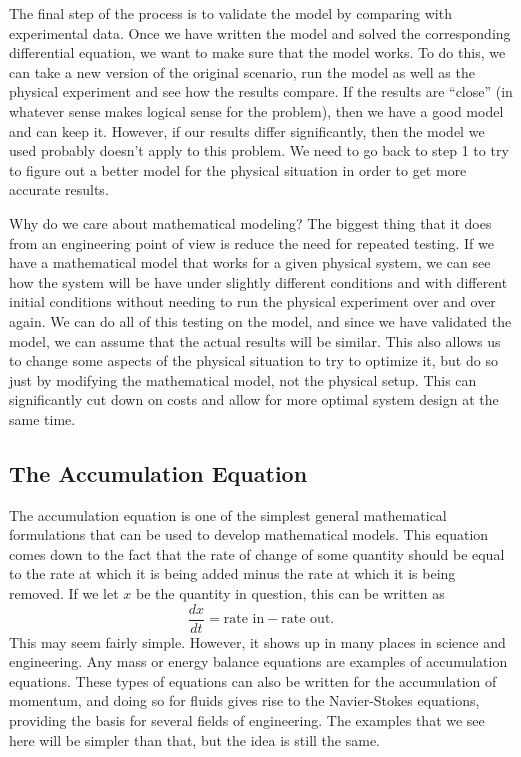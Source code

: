 The final step of the process is to validate the model by comparing with experimental data. Once we have written the model and solved the corresponding differential equation, we want to make sure that the model works. To do this, we can take a new version of the original scenario, run the model as well as the physical experiment and see how the results compare. If the results are ``close'' (in whatever sense makes logical sense for the problem), then we have a good model and can keep it. However, if our results differ significantly, then the model we used probably doesn't apply to this problem. We need to go back to step 1 to try to figure out a better model for the physical situation in order to get more accurate results.

Why do we care about mathematical modeling? The biggest thing that it does from an engineering point of view is reduce the need for repeated testing. If we have a mathematical model that works for a given physical system, we can see how the system will be have under slightly different conditions and with different initial conditions without needing to run the physical experiment over and over again. We can do all of this testing on the model, and since we have validated the model, we can assume that the actual results will be similar. This also allows us to change some aspects of the physical situation to try to optimize it, but do so just by modifying the mathematical model, not the physical setup. This can significantly cut down on costs and allow for more optimal system design at the same time.

\subsection{The Accumulation Equation}

The accumulation equation is one of the simplest general mathematical formulations that can be used to develop mathematical models. This equation comes down to the fact that the rate of change of some quantity should be equal to the rate at which it is being added minus the rate at which it is being removed. If we let $x$ be the quantity in question, this can be written as
\begin{equation}
\frac{dx}{dt} = \text{rate in} - \text{rate out}.
\label{accum:eqn}
\end{equation}
This may seem fairly simple. However, it shows up in many places in science and engineering. Any mass or energy balance equations are examples of accumulation equations. These types of equations can also be written for the accumulation of momentum, and doing so for fluids gives rise to the Navier-Stokes equations, providing the basis for several fields of engineering. The examples that we see here will be simpler than that, but the idea is still the same. 

